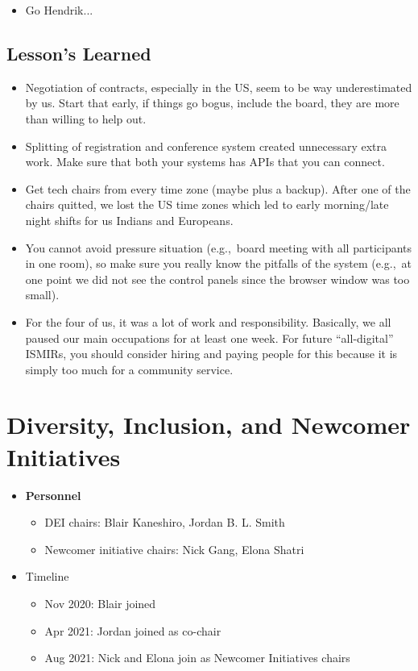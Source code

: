 \documentclass[%
10pt,								%
titlepage,						%
]
{scrartcl}
\begin{document}
\begin{itemize}
    \item Go Hendrik...
\end{itemize}

\subsection{Lesson's Learned}

\begin{itemize}
    \item Negotiation of contracts, especially in the US, seem to be way underestimated by us. Start that early, if things go bogus, include the board, they are more than willing to help out.
    \item Splitting of registration and conference system created unnecessary extra work. Make sure that both your systems has APIs that you can connect.
    \item Get tech chairs from every time zone (maybe plus a backup). After one of the chairs quitted, we lost the US time zones which led to early morning/late night shifts for us Indians and Europeans.
    \item You cannot avoid pressure situation (e.g.,~board meeting with all participants in one room), so make sure you really know the pitfalls of the system (e.g.,~at one point we did not see the control panels since the browser window was too small).
    \item For the four of us, it was a lot of work and responsibility. Basically, we all paused our main occupations for at least one week. For future ``all-digital'' ISMIRs, you should consider hiring and paying people for this because it is simply too much for a community service.
\end{itemize}

\section{Diversity, Inclusion, and Newcomer Initiatives}
    \begin{itemize}
        \item \textbf{Personnel}
            \begin{itemize}
                \item   DEI chairs: Blair Kaneshiro, Jordan B. L. Smith
                \item   Newcomer initiative chairs: Nick Gang, Elona Shatri
            \end{itemize}
        \item   Timeline
            \begin{itemize}
                \item   Nov 2020: Blair joined 
                \item   Apr 2021: Jordan joined as co-chair
                \item   Aug 2021: Nick and Elona join as Newcomer Initiatives chairs
            \end{itemize}
    \end{itemize}
    
\end{document}
